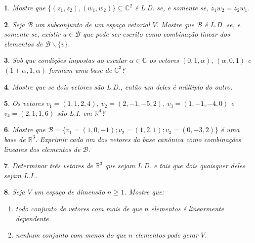 \documentclass[12pt]{exam}
\newtheorem{exercicio}{}
\newcommand{\real}{\mathbb{R}}
\newcommand{\complex}{\mathbb{C}}
\begin{document}
\begin{exercicio}
  Mostre que $\{ (z_1, z_2), (w_1, w_2)\} \subseteq \complex^2$ é L.D. se, e somente se, $z_1w_2 = z_2w_1$.
\end{exercicio}

\begin{exercicio}
  Seja $\mathcal{B}$ um subconjunto de um espaço vetorial $V$. Mostre que $\mathcal{B}$ é L.D. se, e somente se, existir $u \in \mathcal{B}$ que pode ser escrito como combinação linear dos elementos de $\mathcal{B} \backslash \{v\}$.
\end{exercicio}
\begin{exercicio}
  Sob que condi\c{c}\~oes impostas ao escalar $\alpha \in \complex$ os vetores $(0,1,\alpha)$, $(\alpha,0,1)$ e $(1 + \alpha, 1, \alpha)$ formam uma base de $\complex^3$?
\end{exercicio}

\begin{exercicio}
  Mostre que se dois vetores s\~ao L.D., ent\~ao um deles \'e m\'ultiplo do outro.
\end{exercicio}

\begin{exercicio}
  Os vetores $v_1 = (1,1,2,4)$, $v_2 = (2,-1,-5,2)$, $v_3 = (1,-1,-4,0)$ e $v_4 = (2,1,1,6)$ s\~ao L.I. em $\real^4$?
\end{exercicio}

\begin{exercicio}
  Mostre que $\mathcal{B} = \{v_1 = (1,0,-1);v_2=(1,2,1);v_3=(0,-3,2)\}$ \'e uma base de $\real^3$. Exprimir cada um dos vetores da base can\^onica como combina\c{c}\~oes lineares dos elementos de $\mathcal{B}$.
\end{exercicio}

\begin{exercicio}
  Determinar tr\^es vetores de $\real^3$ que sejam L.D. e tais que dois quaisquer deles sejam L.I..
\end{exercicio}

\begin{exercicio}
  Seja $V$ um espa\c{c}o de dimens\~ao $n \ge 1$. Mostre que:
  \begin{enumerate}[label={\alph*})]
    \item todo conjunto de vetores com mais de que $n$ elementos \'e linearmente dependente.
    \item nenhum conjunto com menos do que $n$ elementos pode gerar $V$.
  \end{enumerate}
\end{exercicio}
\end{document}
